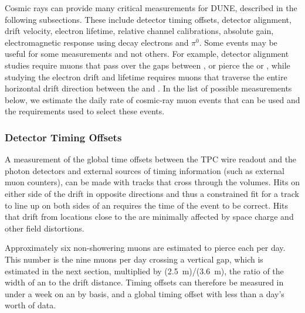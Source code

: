 Cosmic rays can provide many critical measurements for DUNE, described in the following subsections. These include detector timing offsets, detector alignment, drift velocity, electron lifetime, relative channel calibrations, absolute gain,  electromagnetic response using decay electrons and $\pi^0$.
Some events may be useful for some measurements and not others.  For example, detector alignment studies require muons that pass over the gaps between
, or pierce the  or  , while studying the electron drift and lifetime requires muons
that traverse the entire horizontal drift direction between the  and .  In the list of
possible measurements below, we estimate the daily rate of cosmic-ray muon events that can be used
and the requirements used to select these events.

\subsubsection{Detector Timing Offsets}

A measurement of the global time offsets between the TPC wire readout and the photon detectors
and external sources of timing information (such as external muon counters), can be made
with tracks that cross through the  volumes.  Hits on either side of the  drift in opposite
directions and thus a constrained fit for a track to line up on both sides of an  requires the
time of the event to be correct.  Hits that drift from locations close to the  are minimally
affected by space charge and other field distortions.

Approximately six non-showering muons are estimated to pierce each  per day.  This number
is the nine muons per day crossing a vertical gap, which is estimated in the next section, multiplied
by (\SI{2.5}{\m})/(\SI{3.6}{\m}), the ratio of the width of an  to the drift distance.  Timing offsets can therefore
be measured in under a week on an  by  basis, and a global timing offset with less than a day's worth
of data.
 
